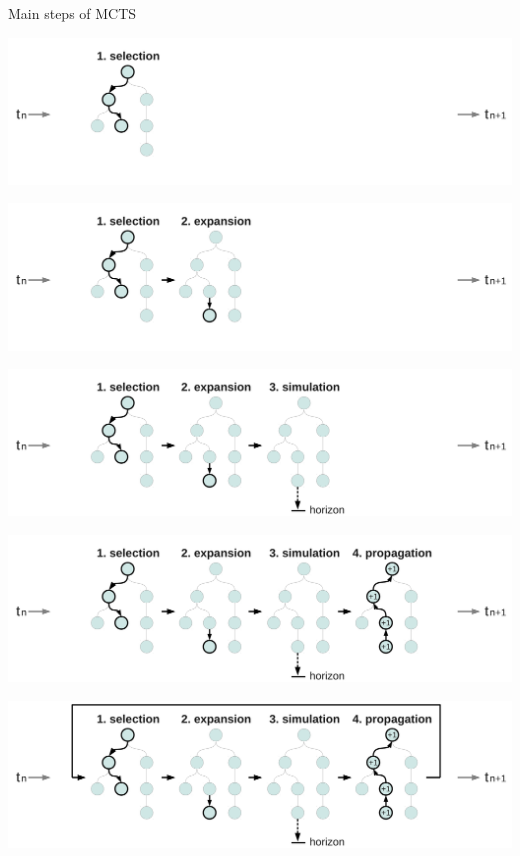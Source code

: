 \begin{frame}{Main steps of MCTS}
     {
        \begin{center}
            \includegraphics[width=.75\linewidth]{figs/tree10a}
        \end{center}
    }
     {
        \begin{center}
            \includegraphics[width=.75\linewidth]{figs/tree10b}
        \end{center}
    }
     {
        \begin{center}
            \includegraphics[width=.75\linewidth]{figs/tree10c}
        \end{center}
    }
     {
        \begin{center}
            \includegraphics[width=.75\linewidth]{figs/tree10d}
        \end{center}
    }
     {
        \begin{center}
            \includegraphics[width=.75\linewidth]{figs/tree10e}

\end{center}}
\end{frame}

